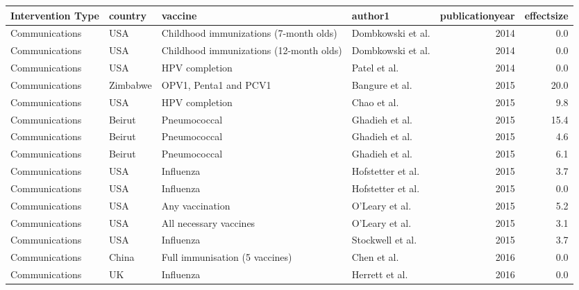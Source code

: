 
\begin{tabular}{llllrr}
\toprule
Intervention Type & country & vaccine & author1 & publicationyear & effectsize\\
\midrule
Communications & USA & Childhood immunizations (7-month olds) & Dombkowski et al. & 2014 & 0.0\\
Communications & USA & Childhood immunizations (12-month olds) & Dombkowski et al. & 2014 & 0.0\\
Communications & USA & HPV completion & Patel et al. & 2014 & 0.0\\
Communications & Zimbabwe & OPV1, Penta1 and PCV1 & Bangure et al. & 2015 & 20.0\\
Communications & USA & HPV completion & Chao et al. & 2015 & 9.8\\
\addlinespace
Communications & Beirut & Pneumococcal & Ghadieh et al. & 2015 & 15.4\\
Communications & Beirut & Pneumococcal & Ghadieh et al. & 2015 & 4.6\\
Communications & Beirut & Pneumococcal & Ghadieh et al. & 2015 & 6.1\\
Communications & USA & Influenza & Hofstetter et al. & 2015 & 3.7\\
Communications & USA & Influenza & Hofstetter et al. & 2015 & 0.0\\
\addlinespace
Communications & USA & Any vaccination & O'Leary et al. & 2015 & 5.2\\
Communications & USA & All necessary vaccines & O'Leary et al. & 2015 & 3.1\\
Communications & USA & Influenza & Stockwell et al. & 2015 & 3.7\\
Communications & China & Full immunisation (5 vaccines) & Chen et al. & 2016 & 0.0\\
Communications & UK & Influenza & Herrett et al. & 2016 & 0.0\\
\bottomrule
\end{tabular}
